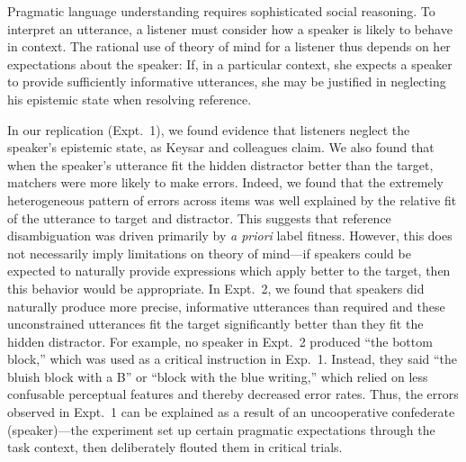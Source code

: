 \documentclass[10pt,letterpaper]{article}
\begin{document}
Pragmatic language understanding requires sophisticated social reasoning. To interpret an utterance, a listener must consider how a speaker is likely to behave in context.
The rational use of theory of mind for a listener thus depends on her expectations about the speaker: If, in a particular context, she expects a speaker to provide sufficiently informative utterances, she may be justified in neglecting his epistemic state when resolving reference.

In our replication (Expt.~1), we found evidence that listeners neglect the speaker's epistemic state, as Keysar and colleagues claim.
We also found that when the speaker's utterance fit the hidden distractor better than the target, matchers were more likely to make errors. 
Indeed, we found that the extremely heterogeneous pattern of errors across items was well explained by the relative fit of the utterance to target and distractor.
This suggests that reference disambiguation was driven primarily by \emph{a priori} label fitness. 
%
However, this does not necessarily imply limitations on theory of mind---if speakers could be expected to naturally provide expressions which apply better to the target, then this behavior would be appropriate.
In Expt.~2, we found that speakers did naturally produce more precise, informative utterances than required and these unconstrained utterances fit the target significantly better than they fit the hidden distractor. 
For example, no speaker in Expt.~2 produced ``the bottom block,'' which was used as a critical instruction in Exp.~1. Instead, they said ``the bluish block with a B'' or ``block with the blue writing,'' which relied on less confusable perceptual features and thereby decreased error rates. 
Thus, the errors observed in Expt.~1 can be explained as a result of an uncooperative confederate (speaker)---the experiment set up certain pragmatic expectations through the task context, then deliberately flouted them in critical trials. %
\end{document}
